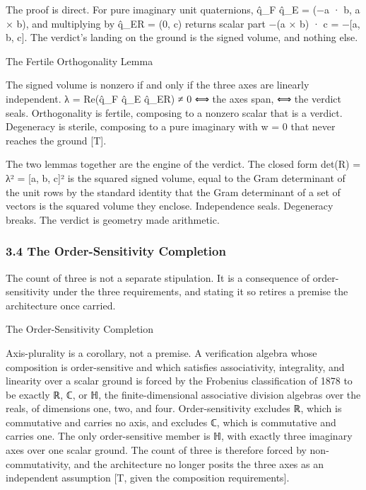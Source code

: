 \documentclass[10pt,twocolumn]{article}
\begin{document}
The proof is direct. For pure imaginary unit quaternions, q̂\_F q̂\_E =
(−a · b, a × b), and multiplying by q̂\_ER = (0, c) returns scalar part
−(a × b) · c = −{[}a, b, c{]}. The verdict's landing on the ground is
the signed volume, and nothing else.

\begin{jbox}{The Fertile Orthogonality Lemma}

The signed volume is nonzero if and only if the three axes are linearly
independent. λ = Re(q̂\_F q̂\_E q̂\_ER) ≠ 0 ⟺ the axes span, ⟺ the verdict
seals. Orthogonality is fertile, composing to a nonzero scalar that is a
verdict. Degeneracy is sterile, composing to a pure imaginary with w = 0
that never reaches the ground {[}T{]}.

\end{jbox}

The two lemmas together are the engine of the verdict. The closed form
det(R) = λ² = {[}a, b, c{]}² is the squared signed volume, equal to the
Gram determinant of the unit rows by the standard identity that the Gram
determinant of a set of vectors is the squared volume they enclose.
Independence seals. Degeneracy breaks. The verdict is geometry made
arithmetic.

\hypertarget{the-order-sensitivity-completion}{%
\subsubsection{3.4 The Order-Sensitivity
Completion}\label{the-order-sensitivity-completion}}

The count of three is not a separate stipulation. It is a consequence of
order-sensitivity under the three requirements, and stating it so
retires a premise the architecture once carried.

\begin{jbox}{The Order-Sensitivity Completion}

Axis-plurality is a corollary, not a premise. A verification algebra
whose composition is order-sensitive and which satisfies associativity,
integrality, and linearity over a scalar ground is forced by the
Frobenius classification of 1878 to be exactly ℝ, ℂ, or ℍ, the
finite-dimensional associative division algebras over the reals, of
dimensions one, two, and four. Order-sensitivity excludes ℝ, which is
commutative and carries no axis, and excludes ℂ, which is commutative
and carries one. The only order-sensitive member is ℍ, with exactly
three imaginary axes over one scalar ground. The count of three is
therefore forced by non-commutativity, and the architecture no longer
posits the three axes as an independent assumption {[}T, given the
composition requirements{]}.

\end{jbox}
\end{document}
